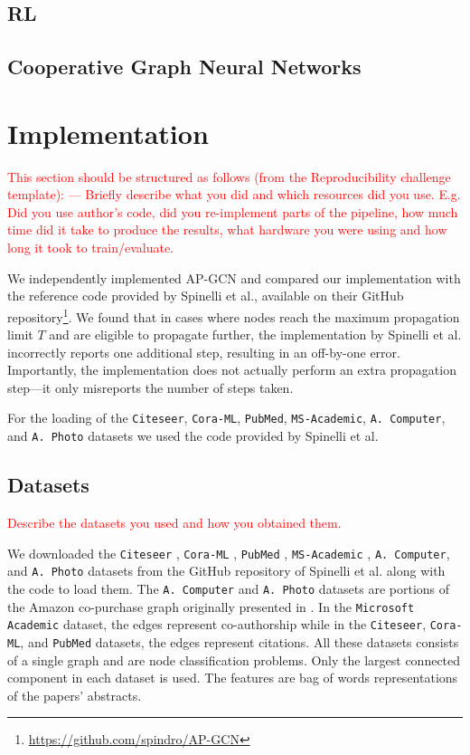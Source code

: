 \documentclass{gdl}
\begin{document}
\subsection{RL}


\subsection{Cooperative Graph Neural Networks}

\section{Implementation}

\textcolor{red}{
This section should be structured as follows (from the Reproducibility challenge template):
---
Briefly describe what you did and which resources did you use. E.g. Did you use author's code, did you re-implement parts of the pipeline, how much time did it take to produce the results, what hardware you were using and how long it took to train/evaluate. }

We independently implemented AP-GCN and compared our implementation with the reference code provided by Spinelli et al., available on their GitHub repository\footnote{\url{https://github.com/spindro/AP-GCN}}. We found that in cases where nodes reach the maximum propagation limit $T$ and are eligible to propagate further, the implementation by Spinelli et al. incorrectly reports one additional step, resulting in an off-by-one error. Importantly, the implementation does not actually perform an extra propagation step—it only misreports the number of steps taken.

For the loading of the \texttt{Citeseer}, \texttt{Cora-ML}, \texttt{PubMed}, \texttt{MS-Academic}, \texttt{A. Computer}, and \texttt{A. Photo} datasets we used the code provided by Spinelli et al.

\subsection{Datasets}
\textcolor{red}{Describe the datasets you used and how you obtained them. }

We downloaded the \texttt{Citeseer} \cite{sen2008}, \texttt{Cora-ML} \cite{mccallum2000}, \texttt{PubMed} \cite{namata2012}, \texttt{MS-Academic} \cite{shchur2018}, \texttt{A. Computer}, and \texttt{A. Photo} datasets from the GitHub repository of Spinelli et al. along with the code to load them. The \texttt{A. Computer} and \texttt{A. Photo} datasets are portions of the Amazon co-purchase graph originally presented in \cite{mcauley2015}. In the \texttt{Microsoft Academic} dataset, the edges represent co-authorship while in the \texttt{Citeseer}, \texttt{Cora-ML}, and \texttt{PubMed} datasets, the edges represent citations. All these datasets consists of a single graph and are node classification problems. Only the largest connected component in each dataset is used. The features are bag of words representations of the papers' abstracts. 
\end{document}
